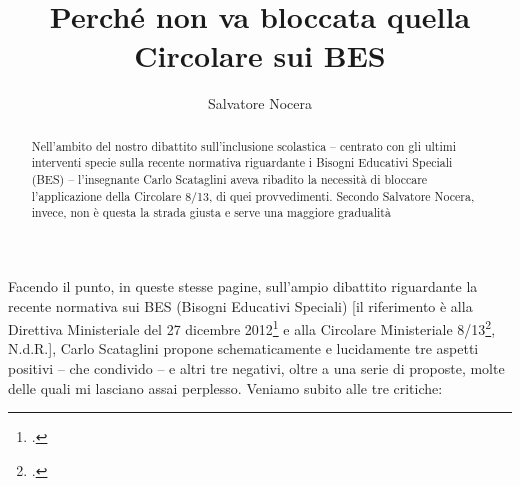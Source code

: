 \author{Salvatore Nocera}
\title{Perché non va bloccata quella Circolare sui BES}
\label{cha:nocera180613}
\begin{abstract}
Nell'ambito del nostro dibattito sull'inclusione scolastica – centrato con gli ultimi interventi specie sulla recente normativa riguardante i Bisogni Educativi Speciali (BES) – l'insegnante Carlo Scataglini aveva ribadito la necessità di bloccare l'applicazione della Circolare 8/13,  di quei provvedimenti. Secondo Salvatore Nocera, invece, non è questa la strada giusta e serve una maggiore gradualità
\end{abstract}
\maketitle
{}
Facendo il punto, in queste stesse pagine, sull'ampio dibattito riguardante la recente normativa sui BES (Bisogni Educativi Speciali) [il riferimento è alla Direttiva Ministeriale del 27 dicembre 2012\footcite{dir27Dic2012} e alla Circolare Ministeriale 8/13\footcite{cm8_2013}, N.d.R.], Carlo Scataglini\pageref{cha:scataglini170613} propone schematicamente e lucidamente tre aspetti positivi – che condivido – e altri tre negativi, oltre a una serie di proposte, molte delle quali mi lasciano assai perplesso.
Veniamo subito alle tre critiche:
